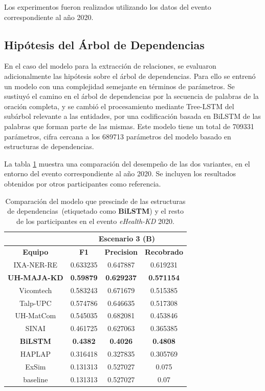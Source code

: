 Los experimentos fueron realizados utilizando los datos del evento correspondiente al año 2020.

\subsection{Hipótesis del Árbol de Dependencias}

En el caso del modelo para la extracción de relaciones, se evaluaron adicionalmente las hipótesis sobre el árbol de dependencias.
Para ello se entrenó un modelo con una complejidad semejante en términos de parámetros.
Se sustiuyó el camino en el árbol de dependencias por la secuencia de palabras de la oración completa, y se cambió el procesamiento mediante Tree-LSTM del subárbol relevante a las entidades, por una codificación basada en BiLSTM de las palabras que forman parte de las mismas.
Este modelo tiene un total de 709331 parámetros, cifra cercana a los 689713 parámetros del modelo basado en estructuras de dependencias.

La tabla \ref{table:dep_tree_hip} muestra una comparación del desempeño de las dos variantes, en el entorno del evento correspondiente al año 2020. Se incluyen los resultados obtenidos por otros participantes como referencia.

\begin{table}[tb!]\centering
	\begin{tabular}{|c|c|c|c|}
		\hline
		&  \multicolumn{3}{c|}{\textbf{Escenario 3 (B)}} \\
		\hline
		\textbf{Equipo} & \textbf{F1} & \textbf{Precision} & \textbf{Recobrado} \\
		\hline
		IXA-NER-RE & 0.633235 & 0.647887 & 0.619231 \\
		\textbf{UH-MAJA-KD} & \textbf{0.59879} & \textbf{0.629237} & \textbf{0.571154} \\
		Vicomtech & 0.583243 & 0.671679 & 0.515385 \\
		Talp-UPC & 0.574786 & 0.646635 & 0.517308 \\
		UH-MatCom & 0.545035 & 0.682081 & 0.453846 \\
		SINAI & 0.461725 & 0.627063 & 0.365385 \\
		\textbf{BiLSTM} & \textbf{0.4382} & \textbf{0.4026} & \textbf{0.4808} \\
		HAPLAP & 0.316418 & 0.327835 & 0.305769 \\
		ExSim & 0.131313 & 0.527027 & 0.075 \\
		baseline & 0.131313 & 0.527027 & 0.07 \\	
		\hline
	\end{tabular}
	\caption{Comparación del modelo que prescinde de las estructuras de dependencias~(etiquetado como \textbf{BiLSTM}) y el resto de los participantes en el evento \textit{eHealth-KD} 2020. \label{table:dep_tree_hip}}
\end{table}

